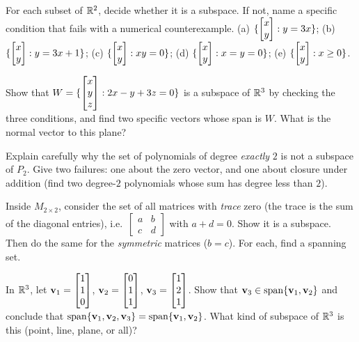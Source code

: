 \begin{exercise}\label{ch11:ex-classify-r2}
For each subset of $\mathbb{R}^2$, decide whether it is a subspace. If not, name a specific
condition that fails with a numerical counterexample.
(a) $\{\begin{bmatrix}x\\y\end{bmatrix} : y = 3x\}$; \quad (b) $\{\begin{bmatrix}x\\y\end{bmatrix} : y = 3x + 1\}$;
(c) $\{\begin{bmatrix}x\\y\end{bmatrix} : xy = 0\}$; \quad (d) $\{\begin{bmatrix}x\\y\end{bmatrix} : x = y = 0\}$;
(e) $\{\begin{bmatrix}x\\y\end{bmatrix} : x \ge 0\}$.
\end{exercise}

\begin{exercise}\label{ch11:ex-r3-plane}
Show that $W = \{\begin{bmatrix}x\\y\\z\end{bmatrix} : 2x - y + 3z = 0\}$ is a subspace of $\mathbb{R}^3$ by checking
the three conditions, and find two specific vectors whose span is $W$. What is the normal
vector to this plane?
\end{exercise}

\begin{exercise}\label{ch11:ex-degree-two}
Explain carefully why the set of polynomials of degree \emph{exactly} $2$ is not a
subspace of $P_2$. Give two failures: one about the zero vector, and one about closure
under addition (find two degree-$2$ polynomials whose sum has degree less than $2$).
\end{exercise}

\begin{exercise}\label{ch11:ex-matrix-subspace}
Inside $M_{2\times 2}$, consider the set of all matrices with \emph{trace} zero (the trace
is the sum of the diagonal entries), i.e.\
$\begin{bmatrix}a&b\\c&d\end{bmatrix}$ with $a + d = 0$. Show it is a subspace. Then do the
same for the \emph{symmetric} matrices ($b = c$). For each, find a spanning set.
\end{exercise}

\begin{exercise}\label{ch11:ex-span-equal}
In $\mathbb{R}^3$, let $\mathbf{v}_1 = \begin{bmatrix}1\\1\\0\end{bmatrix}$, $\mathbf{v}_2 = \begin{bmatrix}0\\1\\1\end{bmatrix}$,
$\mathbf{v}_3 = \begin{bmatrix}1\\2\\1\end{bmatrix}$. Show that $\mathbf{v}_3 \in \operatorname{span}\{\mathbf{v}_1,\mathbf{v}_2\}$ and
conclude that $\operatorname{span}\{\mathbf{v}_1,\mathbf{v}_2,\mathbf{v}_3\} = \operatorname{span}\{\mathbf{v}_1,\mathbf{v}_2\}$. What
kind of subspace of $\mathbb{R}^3$ is this (point, line, plane, or all)?
\end{exercise}

